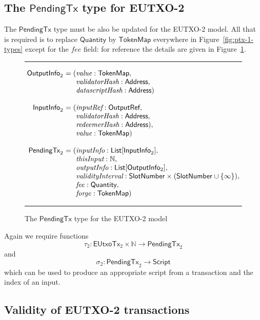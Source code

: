 \documentclass[a4paper]{article}
\renewcommand{\i}{\textit}  %
\newcommand{\s}{\textsf}  %
\theoremstyle{definition}  %
\newenvironment{arraydefs}[1]{\setlength{\arraycolsep}{0pt}\begin{array}{#1}}{\end{array}}
\newcommand\rfskip{7pt}
\newenvironment{ruledfigure}[1]{\begin{figure}[#1]\hrule\vspace{\rfskip}}{\vspace{\rfskip}\hrule\end{figure}}
\newcommand{\List}[1]{\ensuremath{\s{List}[#1]}}
\newcommand{\script}{\ensuremath{\s{Script}}}
\newcommand{\ptx}{\ensuremath{\s{PendingTx}}}
\newcommand{\mi}[1]{\ensuremath{\mathit{#1}}}
\newcommand{\forge}{\mi{forge}}
\newcommand{\fee}{\mi{fee}}
\newcommand{\msf}[1]{\ensuremath{\mathsf{#1}}}
\newcommand{\slotnum}{\msf{SlotNumber}}
\newcommand{\eutxotx}{\msf{EUtxoTx}}
\newcommand{\qty}{\ensuremath{\s{Quantity}}}
\newcommand{\tokenmap}{\ensuremath{\s{TokenMap}}}
\newcommand\N{\ensuremath{\mathbb{N}}}
\begin{document}
\subsection{The $\ptx$ type for EUTXO-2}
\label{sec:pendingtx-2}
The $\ptx$ type must be also be updated for the EUTXO-2 model.  All
that is required is to replace $\qty$ by $\tokenmap$ everywhere in
Figure~\ref{fig:ptx-1-types} except for the $\fee$ field: for reference
the details are given in Figure~\ref{fig:ptx-2-types}.
\begin{ruledfigure}{H}
  \[
  \begin{arraydefs}{rll}
    
    \s{OutputInfo}_2\s{ } &= (& \i{value}: \tokenmap,\\
    && \i{validatorHash}: \s{Address},\\
    &&  \i{datascriptHash}: \s{Address})\\
    \\
    \s{InputInfo}_2\s{ }& = (&\i{inputRef}: \s{OutputRef},\\
                 && \i{validatorHash}: \s{Address},\\
                 && \i{redeemerHash}: \s{Address}),\\
                 && \i{value}: \tokenmap)\\
     \\
     \ptx_2\s{ } &= (&\i{inputInfo}: \List{\s{InputInfo}_2},\\
     &&\i{thisInput}: \N,\\
     &&\i{outputInfo}: \List{\s{OutputInfo$_2$}},\\
     &&\i{validityInterval}: \slotnum \times (\slotnum \cup \{\infty\}),\\
     &&\fee: \qty,\\
     &&\forge: \tokenmap)
   \end{arraydefs}
 \]
  \caption{The $\ptx$ type for the EUTXO-2 model}
  \label{fig:ptx-2-types}
\end{ruledfigure}

\noindent Again we require functions
$$
\tau_2: \eutxotx_2 \times \N \rightarrow \ptx_2
$$
and
$$
\sigma_2: \ptx_2 \rightarrow \script
$$
which can be used to produce an appropriate script from a transaction
and the index of an input.

\subsection{Validity of EUTXO-2 transactions}
\end{document}
